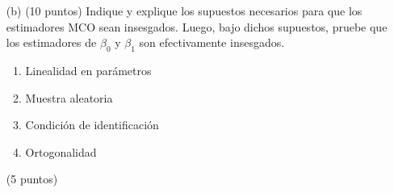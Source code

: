 \documentclass[10pt,a4paper]{article}
\begin{document}
\begin{enumerate}
\begin{enumerate}
\color{blue} Dado el modelo lineal simple:
\[
y_i = \beta_0 + \beta_1 x_i + \varepsilon_i, \quad i = 1, 2, \ldots, n
\]
Queremos encontrar los estimadores \(\hat{\beta}_0\) y \(\hat{\beta}_1\) que minimizan la suma de los errores al cuadrado:
\[
S = \sum_{i=1}^{n} (y_i - \beta_0 - \beta_1 x_i)^2
\]
\subsection*{Paso 1: Derivadas parciales}
Tomamos derivadas parciales de \(S\) con respecto a \(\beta_0\) y \(\beta_1\) y las igualamos a cero:
\[
\frac{\partial S}{\partial \beta_0} = -2 \sum_{i=1}^{n} (y_i - \beta_0 - \beta_1 x_i) = 0
\]
\[
\frac{\partial S}{\partial \beta_1} = -2 \sum_{i=1}^{n} x_i (y_i - \beta_0 - \beta_1 x_i) = 0
\]
\subsection*{Paso 2: Ecuaciones normales}
De la primera ecuación obtenemos:

(5 puntos)

\[
\sum y_i - n\beta_0 - \beta_1 \sum x_i = 0 \Rightarrow \beta_0 = \bar{y} - \beta_1 \bar{x}
\]
Donde:
\[
\bar{x} = \frac{1}{n} \sum x_i, \quad \bar{y} = \frac{1}{n} \sum y_i
\]
Sustituimos en la segunda ecuación:
\[
\sum x_i (y_i - (\bar{y} - \beta_1 \bar{x}) - \beta_1 x_i) = 0
\Rightarrow \sum x_i (y_i - \bar{y} + \beta_1 \bar{x} - \beta_1 x_i) = 0
\]
Reordenando:
\[
\sum x_i(y_i - \bar{y}) + \beta_1 \sum x_i (\bar{x} - x_i) = 0
\]
Observamos que \(\sum x_i (\bar{x} - x_i) = \bar{x} \sum x_i - \sum x_i^2 = n \bar{x}^2 - \sum x_i^2 \neq 0\), entonces:
\[
\hat{\beta}_1 = \frac{\sum_{i=1}^{n} (x_i - \bar{x})(y_i - \bar{y})}{\sum_{i=1}^{n} (x_i - \bar{x})^2}
\]
(5 puntos)
\color{black}
    \item[(b)] (10 puntos) Indique y explique los supuestos necesarios para que los estimadores MCO sean insesgados. Luego, bajo dichos supuestos, pruebe que los estimadores de \( \beta_0 \) y \( \beta_1 \) son efectivamente insesgados.

\color{blue}
\begin{enumerate}
    \item Linealidad en parámetros
    \item Muestra aleatoria
    \item Condición de identificación
    \item Ortogonalidad
\end{enumerate}
(5 puntos)


\end{enumerate}
\end{enumerate}
\end{document}
